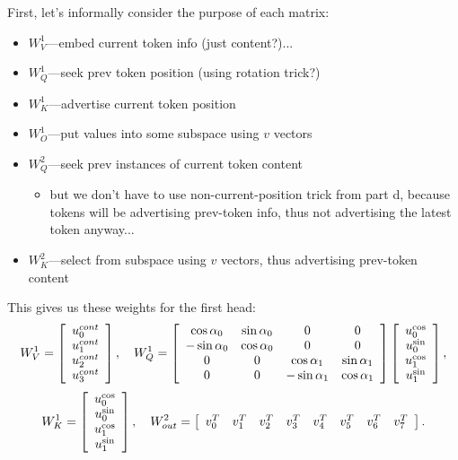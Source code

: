 \documentclass[11pt]{article}
\newenvironment{answerbox}%
  {\begin{mdframed}[linecolor=darkgray,%
                    roundcorner=10pt,innertopmargin=10pt,%
                    innerbottommargin=10pt,skipabove=12pt,skipbelow=12pt]}%
  {\end{mdframed}}
\begin{document}
\begin{answerbox}
First, let's informally consider the purpose of each matrix:
\begin{itemize}
    \item $W_V^{1}$---embed current token info (just content?)...
    \item $W_Q^{1}$---seek prev token position (using rotation trick?)
    \item $W_K^{1}$---advertise current token position
    \item $W_O^{1}$---put values into some subspace using $v$ vectors
    \item $W_Q^{2}$---seek prev instances of current token content
    \begin{itemize}
        \item but we don't have to use non-current-position trick from part d, because tokens will be advertising prev-token info, thus not advertising the latest token anyway...
    \end{itemize}
    \item $W_K^{2}$---select from subspace using $v$ vectors, thus advertising prev-token content
\end{itemize}

This gives us these weights for the first head:
$$
W_V^{1} = \left[
\begin{array}{*{1}c}
u^{cont}_0 \\
u^{cont}_1 \\
u^{cont}_2 \\
u^{cont}_3 \\
\end{array}
\right], \quad
W_Q^1 = \left[
\begin{array}{*{4}c}
\cos \alpha_0 & \sin \alpha_0 & 0 & 0 \\
-\sin \alpha_0 & \cos \alpha_0 & 0 & 0 \\
0 & 0 & \cos \alpha_1 & \sin \alpha_1 \\
0 & 0 & -\sin \alpha_1 & \cos \alpha_1 \\
\end{array}
\right]
\left[
\begin{array}{*{1}c}
u^{\cos}_0 \\
u^{\sin}_0 \\
u^{\cos}_1 \\
u^{\sin}_1 \\
\end{array}
\right],
$$
$$
W_K^1 = \left[
\begin{array}{*{1}c}
u^{\cos}_0 \\
u^{\sin}_0 \\
u^{\cos}_1 \\
u^{\sin}_1 \\
\end{array}
\right], \quad
W_{out}^2 = \left[
\begin{array}{*{8}c}
v_0^T & v_1^T & v_2^T & v_3^T & v_4^T & v_5^T & v_6^T & v_7^T
\end{array}
\right].
$$


\end{answerbox}
\end{document}
